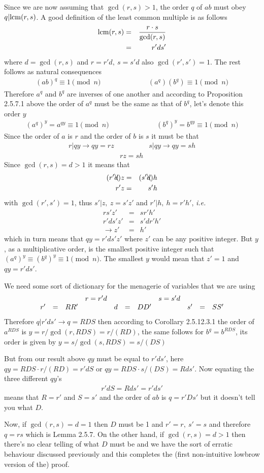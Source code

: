 \documentclass[aps,preprint,preprintnumbers,nofootinbib,showpacs,prd]{revtex4-1}
\newcommand{\ie}{{\it i.e.} }
\newcommand{\ba}{\begin{array}}
\newcommand{\ea}{\end{array}}
\newcommand{\nbea}{\begin{eqnarray*}}
\newcommand{\neea}{\end{eqnarray*}}
\begin{document}
Since we are now assuming that $\gcd(r,s) > 1$, the order $q$ of $ab$ must obey $q |{\rm lcm}(r,s)$. A good definition of the least common multiple is as follows
%
\nbea
{\rm lcm}(r,s) & = & \frac{r \cdot s}{\gcd(r,s)} \\
& = & r' d s'
\neea
%
where $d = \gcd(r,s)$ and $r = r'd, ~ s = s'd$ also $\gcd(r',s') = 1$. The rest follows as natural consequences
%
\nbea
(ab)^q \equiv 1 \pmod{n} & ~~~~~~~~~~~~~~~~~~~~~~~ & (a^q)(b^q) \equiv 1 \pmod{n}
\neea
%
Therefore $a^q$ and $b^q$ are inverses of one another and according to Proposition 2.5.7.1 above the order of $a^q$ must be the same as that of $b^q$, let's denote this order $y$
%
\nbea
(a^q)^y  = a^{qy} \equiv 1 \pmod{n} & ~~~~~~~~~~~~~~~~~~~~~~~ & (b^q)^y  = b^{qy} \equiv 1 \pmod{n}
\neea
%
Since the order of $a$ is $r$ and the order of $b$ is $s$ it must be that
%
\nbea
r | qy \to qy = rz & & s | qy \to qy = sh \\
& rz = sh &
\neea
%
Since $\gcd(r,s) = d > 1$ it means that 
%
\nbea
(r' \bcancel{d}) z & = & (s' \bcancel{d}) h \\
r' z & = & s' h
\neea
%
with $\gcd(r',s') = 1$, thus $s'|z, ~z = s'z'$ and $r'|h, ~h = r'h'$, \ie
%
\nbea
rs'z' & = & sr'h' \\
r'ds'z' & = & s'dr'h' \\
\to z' & = & h'
\neea
%
which in turn means that $qy = r'ds' z'$ where $z'$ can be any positive integer. But $y$, as a multiplicative order, is the smallest positive integer such that $(a^q)^y \equiv (b^q)^y \equiv 1 \pmod{n}$. The smallest $y$ would mean that $z' = 1$ and $qy = r' d s'$.


We need some sort of dictionary for the menagerie of variables that we are using
%
\nbea
\ba{r c l c r c l c r c l}
&&& r = r' d &&&& s = s' d \\
r' & = & R R' & ~~~ & d & = & D D' & ~~~ & s' & = & S S'
\ea
\neea
%
Therefore $q|r'ds' \to q = R D S$ then according to Corollary 2.5.12.3.1 the order of $a^{R D S}$ is $y = r/\gcd(r,R D S) = r/(R D)$, the same follows for $b^q = b^{R D S}$, its order is given by $y = s/\gcd(s,R D S) = s/(D S)$

But from our result above $qy$ must be equal to $r' d s'$, here $qy = R D S \cdot r/(R D) = r' d S$ or $qy =R D S \cdot s/(D S) = R d s'$. Now equating the three different $qy$'s
%
\nbea
r' d S = R d s' = r' d s'
\neea
%
means that $R = r'$ and $S = s'$ and the order of $ab$ is $q = r' D s'$ but it doesn't tell you what $D$.

Now, if $\gcd(r,s) = d = 1$ then $D$ must be 1 and $r' = r, ~s' = s$ and therefore $q = rs$ which is Lemma 2.5.7. On the other hand, if $\gcd(r,s) = d > 1$ then there's no clear telling of what $D$ must be and we have the sort of erratic behaviour discussed previously and this completes the (first non-intuitive lowbrow version of the) proof.
\end{document}
